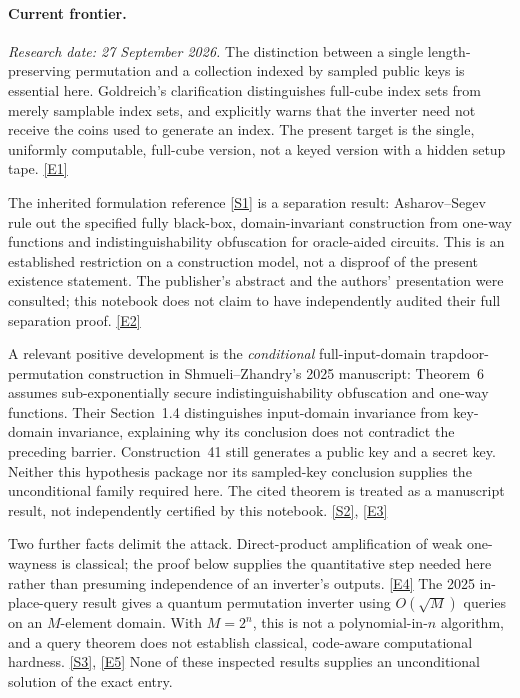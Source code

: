 \documentclass[11pt,a4paper]{article}
\newcommand{\sref}[2]{\hyperlink{source:#1:#2}{[S#2]}}
\newcommand{\eref}[2]{\hyperlink{extra:#1:#2}{[E#2]}}
\numberwithin{equation}{section}
\begin{document}
\paragraph{Current frontier.}
\textit{Research date: 27 September 2026.}
The distinction between a single length-preserving permutation and a
collection indexed by sampled public keys is essential here. Goldreich's
clarification distinguishes full-cube index sets from merely samplable
index sets, and explicitly warns that the inverter need not receive the
coins used to generate an index. The present target is the single,
uniformly computable, full-cube version, not a keyed version with a hidden
setup tape. \eref{50}{1}

The inherited formulation reference \sref{50}{1} is a separation result:
Asharov--Segev rule out the specified fully black-box, domain-invariant
construction from one-way functions and indistinguishability obfuscation
for oracle-aided circuits. This is an established restriction on a
construction model, not a disproof of the present existence statement.
The publisher's abstract and the authors' presentation were consulted;
this notebook does not claim to have independently audited their full
separation proof. \eref{50}{2}

A relevant positive development is the \emph{conditional} full-input-domain
trapdoor-permutation construction in Shmueli--Zhandry's 2025 manuscript:
Theorem~6 assumes sub-exponentially secure indistinguishability obfuscation
and one-way functions. Their Section~1.4 distinguishes input-domain
invariance from key-domain invariance, explaining why its conclusion does
not contradict the preceding barrier. Construction~41 still generates a
public key and a secret key. Neither this hypothesis package nor its
sampled-key conclusion supplies the unconditional family required here.
The cited theorem is treated as a manuscript result, not independently
certified by this notebook. \sref{50}{2}, \eref{50}{3}

Two further facts delimit the attack. Direct-product amplification of weak
one-wayness is classical; the proof below supplies the quantitative step
needed here rather than presuming independence of an inverter's outputs.
\eref{50}{4} The 2025 in-place-query result gives a quantum permutation
inverter using $O(\sqrt{M})$ queries on an $M$-element domain. With
$M=2^n$, this is not a polynomial-in-$n$ algorithm, and a query theorem does
not establish classical, code-aware computational hardness.
\sref{50}{3}, \eref{50}{5} None of these inspected results supplies an
unconditional solution of the exact entry.
\end{document}
